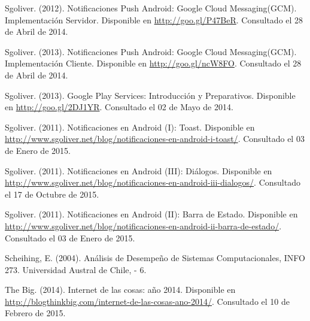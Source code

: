 \begin{spacing}{1.0}
\begin{thebibliography}{99}
\newblock Sgoliver. (2012).
\newblock Notificaciones Push Android: Google Cloud Messaging(GCM). Implementación Servidor.
\newblock Disponible en \url{http://goo.gl/P47BeR}.
\newblock Consultado el 28 de Abril de 2014.

\newblock Sgoliver. (2013).
\newblock Notificaciones Push Android: Google Cloud Messaging(GCM). Implementación Cliente.
\newblock Disponible en \url{http://goo.gl/ncW8FO}.
\newblock Consultado el 28 de Abril de 2014.

\newblock Sgoliver. (2013).
\newblock Google Play Services: Introducción y Preparativos.
\newblock Disponible en \url{http://goo.gl/2DJ1YR}.
\newblock Consultado el 02 de Mayo de 2014.

\newblock Sgoliver. (2011).
\newblock Notificaciones en Android (I): Toast.
\newblock Disponible en \url{http://www.sgoliver.net/blog/notificaciones-en-android-i-toast/}.
\newblock Consultado el 03 de Enero de 2015.

\newblock Sgoliver. (2011).
\newblock Notificaciones en Android (III): Diálogos.
\newblock Disponible en \url{http://www.sgoliver.net/blog/notificaciones-en-android-iii-dialogos/}.
\newblock Consultado el 17 de Octubre de 2015.

\newblock Sgoliver. (2011).
\newblock Notificaciones en Android (II): Barra de Estado.
\newblock Disponible en \url{http://www.sgoliver.net/blog/notificaciones-en-android-ii-barra-de-estado/}.
\newblock Consultado el 03 de Enero de 2015.

\newblock Scheihing, E. (2004).
\newblock Análisis de Desempeño de Sistemas Computacionales, INFO 273.
\newblock Universidad Austral de Chile,
 - 6.


\newblock The Big. (2014).
\newblock Internet de las cosas: año 2014.
\newblock Disponible en \url{http://blogthinkbig.com/internet-de-las-cosas-ano-2014/}.
\newblock Consultado el 10 de Febrero de 2015.








\end{thebibliography}	
\end{spacing}
